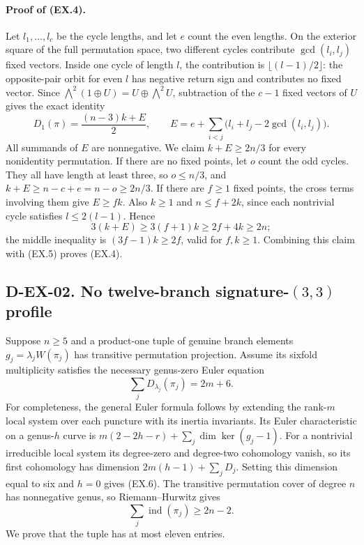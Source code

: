 \paragraph{Proof of (EX.4).}
Let $l_1,\ldots,l_c$ be the cycle lengths, and let $e$ count the
even lengths.  On the exterior square of the full permutation space,
two different cycles contribute $\gcd(l_i,l_j)$ fixed vectors.
Inside one cycle of length $l$, the contribution is
$\lfloor(l-1)/2\rfloor$: the opposite-pair orbit for even $l$ has
negative return sign and contributes no fixed vector.  Since
$\bigwedge^2(1\oplus U)=U\oplus\bigwedge^2U$, subtraction of the
$c-1$ fixed vectors of $U$ gives the exact identity
\[
 D_1(\pi)=\frac{(n-3)k+E}{2},\qquad
 E=e+\sum_{i<j}\bigl(l_i+l_j-2\gcd(l_i,l_j)\bigr).
                                                               \tag{EX.5}
\]
All summands of $E$ are nonnegative.  We claim $k+E\ge2n/3$ for
every nonidentity permutation.
If there are no fixed points, let $o$ count the odd cycles.
They all have length at least three, so $o\le n/3$, and
$k+E\ge n-c+e=n-o\ge2n/3$.
If there are $f\ge1$ fixed points, the cross terms involving them
give $E\ge fk$.  Also $k\ge1$ and $n\le f+2k$, since each
nontrivial cycle satisfies $l\le2(l-1)$.  Hence
\[
 3(k+E)\ge3(f+1)k\ge2f+4k\ge2n;
\]
the middle inequality is $(3f-1)k\ge2f$, valid for $f,k\ge1$.
Combining this claim with (EX.5) proves (EX.4).

\subsection*{D-EX-02. No twelve-branch signature-$(3,3)$ profile}

Suppose $n\ge5$ and a product-one tuple of genuine branch elements
$g_j=\lambda_j W(\pi_j)$ has transitive permutation projection.
Assume its sixfold multiplicity satisfies the necessary genus-zero
Euler equation
\[
             \sum_jD_{\lambda_j}(\pi_j)=2m+6.            \tag{EX.6}
\]
For completeness, the general Euler formula follows by extending the
rank-$m$ local system over each puncture with its inertia invariants.
Its Euler characteristic on a genus-$h$ curve is
$m(2-2h-r)+\sum_j\dim\ker(g_j-1)$.
For a nontrivial irreducible local system its degree-zero and degree-two
cohomology vanish, so its first cohomology has dimension
$2m(h-1)+\sum_jD_j$.  Setting this dimension equal to six and $h=0$
gives (EX.6).
The transitive permutation cover of degree $n$ has nonnegative genus,
so Riemann--Hurwitz gives
\[
                    \sum_j\operatorname{ind}(\pi_j)\ge2n-2.
                                                               \tag{EX.7}
\]
We prove that the tuple has at most eleven entries.

